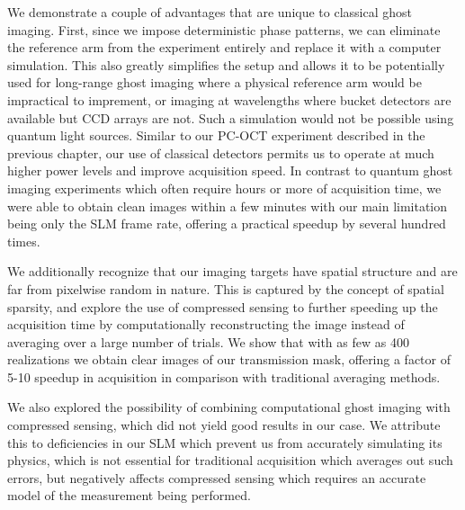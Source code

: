 We demonstrate a couple of advantages that are unique to classical ghost imaging. First, since we impose deterministic phase patterns, we can eliminate the reference arm from the experiment entirely and replace it with a computer simulation. This also greatly simplifies the setup and allows it to be potentially used for long-range ghost imaging where a physical reference arm would be impractical to imprement, or imaging at wavelengths where bucket detectors are available but CCD arrays are not. Such a simulation would not be possible using quantum light sources. Similar to our PC-OCT experiment described in the previous chapter, our use of classical detectors permits us to operate at much higher power levels and improve acquisition speed. In contrast to quantum ghost imaging experiments which often require hours or more of acquisition time, we were able to obtain clean images within a few minutes with our main limitation being only the SLM frame rate, offering a practical speedup by several hundred times.

We additionally recognize that our imaging targets have spatial structure and are far from pixelwise random in nature. This is captured by the concept of spatial sparsity, and explore the use of compressed sensing to further speeding up the acquisition time by computationally reconstructing the image instead of averaging over a large number of trials. We show that with as few as 400 realizations we obtain clear images of our transmission mask, offering a factor of 5-10 speedup in acquisition in comparison with traditional averaging methods.

We also explored the possibility of combining computational ghost imaging with compressed sensing, which did not yield good results in our case. We attribute this to deficiencies in our SLM which prevent us from accurately simulating its physics, which is not essential for traditional acquisition which averages out such errors, but negatively affects compressed sensing which requires an accurate model of the measurement being performed. 

